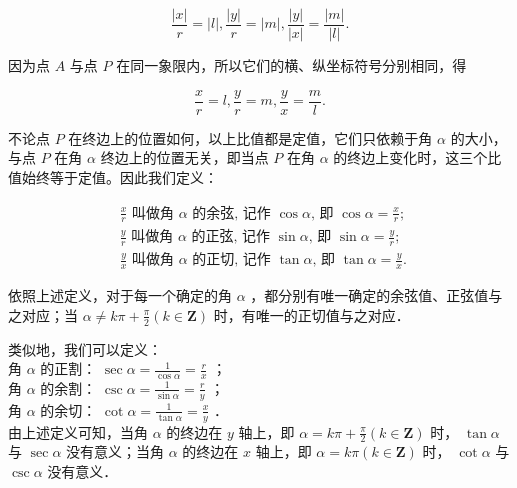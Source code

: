\documentclass[10pt]{article}
\begin{document}
\[
\frac{|x|}{r}=|l|, \frac{|y|}{r}=|m|, \frac{|y|}{|x|}=\frac{|m|}{|l|} .
\]

因为点 \(A\) 与点 \(P\) 在同一象限内，所以它们的横、纵坐标符号分别相同，得

\[
\frac{x}{r}=l, \frac{y}{r}=m, \frac{y}{x}=\frac{m}{l} .
\]

不论点 \(P\) 在终边上的位置如何，以上比值都是定值，它们只依赖于角 \(\alpha\) 的大小，与点 \(P\) 在角 \(\alpha\) 终边上的位置无关，即当点 \(P\) 在角 \(\alpha\) 的终边上变化时，这三个比值始终等于定值。因此我们定义：

\[
\begin{aligned}
& \frac{x}{r} \text { 叫做角 } \alpha \text { 的余弦, 记作 } \cos \alpha \text {, 即 } \cos \alpha=\frac{x}{r} \text {; } \\
& \frac{y}{r} \text { 叫做角 } \alpha \text { 的正弦, 记作 } \sin \alpha \text {, 即 } \sin \alpha=\frac{y}{r} \text {; } \\
& \frac{y}{x} \text { 叫做角 } \alpha \text { 的正切, 记作 } \tan \alpha \text {, 即 } \tan \alpha=\frac{y}{x} \text {. }
\end{aligned}
\]

依照上述定义，对于每一个确定的角 \(\alpha\) ，都分别有唯一确定的余弦值、正弦值与之对应；当 \(\alpha \neq k \pi+\frac{\pi}{2}(k \in \mathbf{Z})\) 时，有唯一的正切值与之对应．

类似地，我们可以定义：\\
角 \(\alpha\) 的正割： \(\sec \alpha=\frac{1}{\cos \alpha}=\frac{r}{x}\) ；\\
角 \(\alpha\) 的余割： \(\csc \alpha=\frac{1}{\sin \alpha}=\frac{r}{y}\) ；\\
角 \(\alpha\) 的余切： \(\cot \alpha=\frac{1}{\tan \alpha}=\frac{x}{y}\) ．\\
由上述定义可知，当角 \(\alpha\) 的终边在 \(y\) 轴上，即 \(\alpha=k \pi+\frac{\pi}{2}(k \in \mathbf{Z})\) 时， \(\tan \alpha\) 与 \(\sec \alpha\) 没有意义；当角 \(\alpha\) 的终边在 \(x\) 轴上，即 \(\alpha=k \pi(k \in \mathbf{Z})\) 时， \(\cot \alpha\) 与 \(\csc \alpha\) 没有意义．
\end{document}
